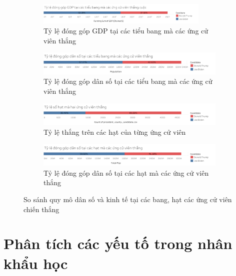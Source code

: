 \documentclass[14pt, a4paper]{article}
\numberwithin{equation}{section}
\numberwithin{figure}{section}
\numberwithin{dl}{section}
\numberwithin{md}{section}
\numberwithin{bd}{section}
\numberwithin{dn}{section}
\numberwithin{hq}{section}
\begin{document}
    \begin{figure}[h!]
        \centering
        \begin{subfigure}[b]{\textwidth}
            \includegraphics[width=0.9\textwidth]{State_Percentage_GDP_Candidate.png}
            \caption{Tỷ lệ đóng góp GDP tại các tiểu bang mà các ứng cử viên thắng}
        \end{subfigure}
        \vfill
        \begin{subfigure}[b]{\linewidth}
            \includegraphics[width=0.9\linewidth]{State_Percentage_Population_Candidate.png}
            \caption{Tỷ lệ đóng góp dân số tại các tiểu bang mà các ứng cử viên thắng}
        \end{subfigure}
        \vfill
        \begin{subfigure}[b]{\textwidth}
            \includegraphics[width=0.9\linewidth]{County_Total_Percentage_Candidate_Win.png}
            \caption{Tỷ lệ thắng trên các hạt của từng ứng cử viên}
        \end{subfigure}
        \vfill
        \begin{subfigure}[b]{\textwidth}
            \includegraphics[width=0.9\linewidth]{County_Percentage_Population_Candidate.png}
            \caption{Tỷ lệ đóng góp dân số tại các hạt mà các ứng cử viên thắng}
        \end{subfigure}
        \caption{So sánh quy mô dân số và kinh tế tại các bang, hạt các ứng cử viên chiến thắng}
    \end{figure}

    \section{Phân tích các yếu tố trong nhân khẩu học}
\end{document}
